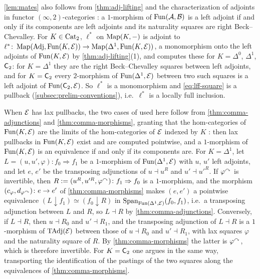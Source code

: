 \begin{rmk}
\label{rmk:mates-alternative}
%
\cref{lem:mates} also follows from \cref{thm:adj-lifting} and the
characterization of adjoints in
functor $(\infty,2)$-categories
\cite[Cor.~5.2.12]{abellangagnahaugseng2024straightening}:
a $1$-morphism of $\operatorname{Fun}(\mathcal{A},\mathcal{B})$ is a left adjoint if and only if its components
are left adjoints and its naturality squares are right Beck--Chevalley.
For $K \in \mathrm{Cat}_{2}$, $\ell^{*}$ on $\operatorname{Map}(K,-)$ is adjoint to
$\ell^{*}\colon \operatorname{Map}(\mathrm{Adj},\operatorname{Fun}(K,\mathcal{E})) \to \operatorname{Map}(\Delta^{1},\operatorname{Fun}(K,\mathcal{E}))$,
a monomorphism onto the left adjoints of $\operatorname{Fun}(K,\mathcal{E})$ by
\cref{thm:adj-lifting}(1), and
\cite[Cor.~5.2.12]{abellangagnahaugseng2024straightening} computes these for $K
= \Delta^{0}$, $\Delta^{1}$, $\mathsf{C}_{2}$: for $K = \Delta^{1}$ they are the right
Beck--Chevalley squares between left adjoints,
and for $K = \mathsf{C}_{2}$ every $2$-morphism of $\operatorname{Fun}(\Delta^{1},\mathcal{E})$ between two such
squares is a left adjoint of $\operatorname{Fun}(\mathsf{C}_{2},\mathcal{E})$.
So $\ell^{*}$ is a monomorphism and \eqref{eq:lff-square} is a pullback
(\cref{subsec:prelim-conventions}), i.e.\ $\ell^{*}$ is a locally full
inclusion.

When $\mathcal{E}$ has lax pullbacks, the two cases of
\cite[Cor.~5.2.12]{abellangagnahaugseng2024straightening} used here follow from
\cref{thm:comma-adjunctions} and \cref{thm:comma-morphisms},
granting that the hom-categories of $\operatorname{Fun}(K,\mathcal{E})$
are the limits of the hom-categories of $\mathcal{E}$ indexed by $K$ :
then lax pullbacks in $\operatorname{Fun}(K,\mathcal{E})$ exist and are computed pointwise,
and a $1$-morphism of $\operatorname{Fun}(K,\mathcal{E})$ is an equivalence if and only if its
components are. For $K = \Delta^{1}$, let
$L = (u,u',\varphi)\colon f_{0} \Rightarrow f_{1}$
be a $1$-morphism of $\operatorname{Fun}(\Delta^{1},\mathcal{E})$ with $u$, $u'$ left adjoints,
and let $e$, $e'$ be the transposing adjunctions of $u \dashv u^{R}$ and $u'
\dashv u'^{R}$. If ${\varphi}^{\curvearrowright}$ is invertible, then
$R := (u^{R},u'^{R},{\varphi}^{\curvearrowright})\colon f_{1} \Rightarrow f_{0}$
is a $1$-morphism, and the morphism
$(c_{\varphi},d_{{\varphi}^{\curvearrowright}})\colon e \to e'$
of \cref{thm:comma-morphisms} makes $(e,e')$ a pointwise equivalence
$(L \downarrow f_{1}) \simeq (f_{0} \downarrow R)$
in
$\mathrm{Span}_{\operatorname{Fun}(\Delta^{1},\mathcal{E})}(f_{0},f_{1})$,
i.e.\ a transposing adjunction between $L$ and $R$,
so $L \dashv R$ by \cref{thm:comma-adjunctions}. Conversely, if $L \dashv R$,
then $u \dashv R_{0}$ and $u' \dashv R_{1}$,
and the transposing adjunction of $L \dashv R$ is a $1$-morphism of $\mathrm{TAdj}(\mathcal{E})$
between those of $u \dashv R_{0}$ and $u' \dashv R_{1}$,
with lax squares $\varphi$ and the naturality square of $R$.
By \cref{thm:comma-morphisms} the latter is ${\varphi}^{\curvearrowright}$,
which is therefore invertible. For $K = \mathsf{C}_{2}$ one argues in the same way,
transporting the identification of the pastings of the two squares along the
equivalences of \cref{thm:comma-morphisms}.
\end{rmk}

